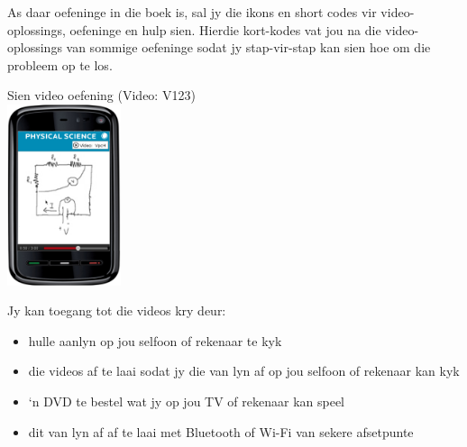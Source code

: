 {\normalsize

As daar oefeninge in die boek is, sal jy die ikons en short codes vir video-oplossings, oefeninge en hulp sien. Hierdie kort-kodes vat jou na die video-oplossings van sommige oefeninge sodat jy stap-vir-stap kan sien hoe om die probleem op te los. \par
\vspace{-0.5cm}
\begin{center}
 Sien video oefening  (Video: V123) \vspace{0.3cm}\\
\includegraphics[width=0.25\textwidth]{title_images/mobilevideoexercise.png}
\end{center}
\par
Jy kan toegang tot die videos kry deur:
\begin{itemize}
    \item hulle aanlyn op jou selfoon of rekenaar te kyk
    \item die videos af te laai sodat jy die van lyn af op jou selfoon of rekenaar kan kyk
    \item ‘n DVD te bestel wat jy op jou TV of rekenaar kan speel
    \item dit van lyn af af te laai met Bluetooth of Wi-Fi van sekere afsetpunte
\end{itemize}
}


